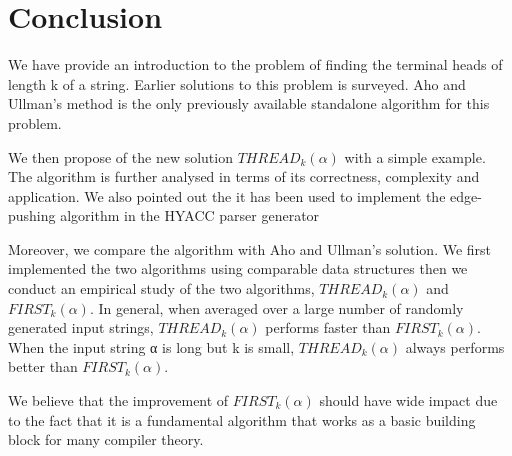 \documentclass{sig-alternate-05-2015}
\begin{document}
\section{Conclusion}
We have provide an introduction to the problem of finding
the terminal heads of length k of a string. Earlier solutions
to this problem is surveyed. Aho and
Ullman's method is the only previously available
standalone algorithm for this problem.

We then propose of the 
new solution $THREAD_k(\alpha)$ with a simple example.
The algorithm is further analysed in terms of its correctness, complexity and application.
We also pointed out the it has been
used to implement the edge-pushing algorithm in the HYACC
parser generator

Moreover, we compare the algorithm with Aho and Ullman's solution.
We first implemented the two algorithms using comparable data structures then we conduct an empirical study of the two algorithms,
$THREAD_k(\alpha)$ and $FIRST_k(\alpha)$. In
general, when averaged over a large number of randomly
generated input strings, $THREAD_k(\alpha)$ performs faster than
$FIRST_k(\alpha)$. When the input string α is long but k is small,
$THREAD_k(\alpha)$ always performs better than $FIRST_k(\alpha)$.

We believe that the improvement of $FIRST_k(\alpha)$ should have wide impact due to the fact that it is a fundamental algorithm
that works as a basic building block for many compiler theory.


%

%
%
\appendix
\end{document}
